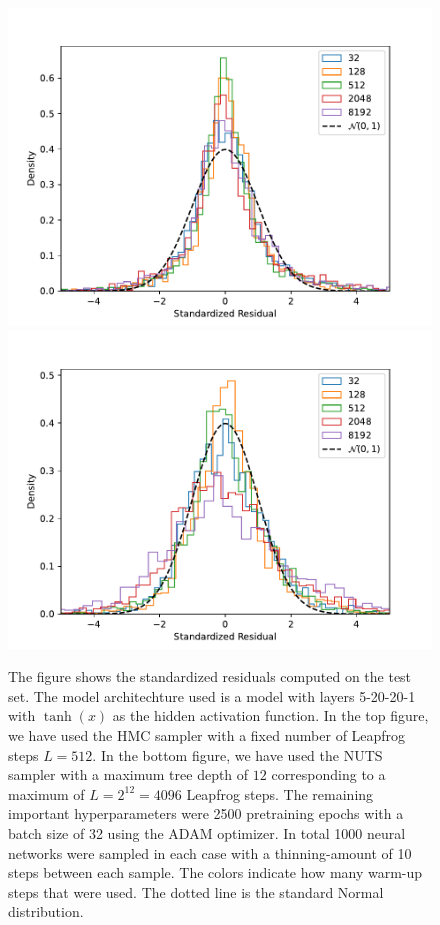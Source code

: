 \begin{figure}[H]
    \centering
    \includegraphics[scale=0.6]{figures/standardized_residuals/effect_of_burnin/standardized_residuals_hmc_vs_burn_in_steps.pdf}
    \includegraphics[scale=0.6]{figures/standardized_residuals/effect_of_burnin/standardized_residuals_nuts_vs_burn_in_steps.pdf}
    \caption{The figure shows the standardized residuals computed on the test set. The model architechture used is a model with layers 5-20-20-1 with $\tanh(x)$ as the hidden activation function. In the top figure, we have used the HMC sampler with a fixed number of Leapfrog steps $L = 512$. In the bottom figure, we have used the NUTS sampler with a maximum tree depth of $12$ corresponding to a maximum of $L = 2^{12} = 4096$ Leapfrog steps. The remaining important hyperparameters were 2500 pretraining epochs with a batch size of 32 using the ADAM optimizer. In total 1000 neural networks were sampled in each case with a thinning-amount of 10 steps between each sample. The colors indicate how many warm-up steps that were used. The dotted line is the standard Normal distribution.
    }
    \label{fig:standardized_residuals_vs_burn_in_steps}
\end{figure}


